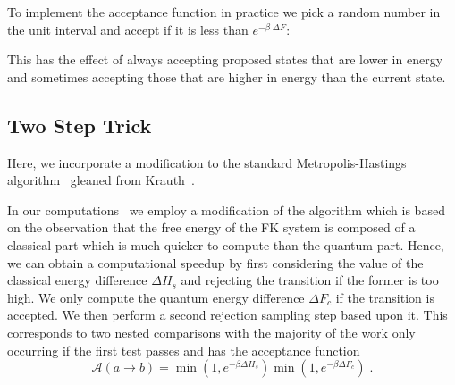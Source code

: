 To implement the acceptance function in practice we pick a random number in the unit interval and accept if it is less than \(e^{-\beta\;\Delta F}\):

\begin{Shaded}
\begin{Highlighting}[]
\OperatorTok{=}

 
\OperatorTok{=}
\OperatorTok{=}

    \NormalTok{,}\NormalTok{) }\OperatorTok{\textless{}}\OperatorTok{{-}}\OperatorTok{*}
\OperatorTok{=}
        
\OperatorTok{=}
\end{Highlighting}
\end{Shaded}

This has the effect of always accepting proposed states that are lower in energy and sometimes accepting those that are higher in energy than the current state.

\hypertarget{two-step-trick}{%
\subsection{Two Step Trick}\label{two-step-trick}}

Here, we incorporate a modification to the standard Metropolis-Hastings algorithm~\autocite{hastingsMonteCarloSampling1970} gleaned from Krauth~\autocite{krauthIntroductionMonteCarlo1998}.

In our computations~\autocite{hodsonMCMCFKModel2021} we employ a modification of the algorithm which is based on the observation that the free energy of the FK system is composed of a classical part which is much quicker to compute than the quantum part. Hence, we can obtain a computational speedup by first considering the value of the classical energy difference \(\Delta H_s\) and rejecting the transition if the former is too high. We only compute the quantum energy difference \(\Delta F_c\) if the transition is accepted. We then perform a second rejection sampling step based upon it. This corresponds to two nested comparisons with the majority of the work only occurring if the first test passes and has the acceptance function \[\mathcal{A}(a \to b) = \min\left(1, e^{-\beta \Delta H_s}\right)\min\left(1, e^{-\beta \Delta F_c}\right)\;.\]

